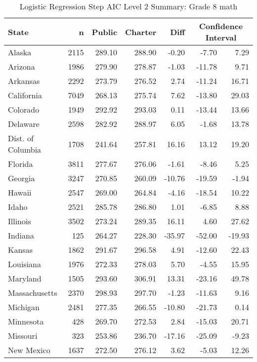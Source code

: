 \begin{table}[ht]
\begin{center}
\caption{Logistic Regression Step AIC Level 2 Summary: Grade 8 math}
\label{g8mathlraiclevel2}
\begin{tabular}{lrrrrrr}
  \hline
  State & n & Public & Charter & Diff & \multicolumn{2}{c}{Confidence Interval} \\ \hline
Alaska & 2115 & 289.10 & 288.90 & -0.20 & -7.70 & 7.29 \\ 
  Arizona & 1986 & 279.90 & 278.87 & -1.03 & -11.78 & 9.71 \\ 
  Arkansas & 2292 & 273.79 & 276.52 & 2.74 & -11.24 & 16.71 \\ 
  California & 7049 & 268.13 & 275.74 & 7.62 & -13.80 & 29.03 \\ 
  Colorado & 1949 & 292.92 & 293.03 & 0.11 & -13.44 & 13.66 \\ 
  Delaware & 2598 & 282.92 & 288.97 & 6.05 & -1.68 & 13.78 \\ 
  Dist. of Columbia & 1708 & 241.64 & 257.81 & 16.16 & 13.12 & 19.20 \\ 
  Florida & 3811 & 277.67 & 276.06 & -1.61 & -8.46 & 5.25 \\ 
  Georgia & 3247 & 270.85 & 260.09 & -10.76 & -19.59 & -1.94 \\ 
  Hawaii & 2547 & 269.00 & 264.84 & -4.16 & -18.54 & 10.22 \\ 
  Idaho & 2521 & 285.78 & 286.80 & 1.01 & -6.85 & 8.88 \\ 
  Illinois & 3502 & 273.24 & 289.35 & 16.11 & 4.60 & 27.62 \\ 
  Indiana & 125 & 264.27 & 228.30 & -35.97 & -52.00 & -19.93 \\ 
  Kansas & 1862 & 291.67 & 296.58 & 4.91 & -12.60 & 22.43 \\ 
  Louisiana & 1976 & 272.33 & 278.03 & 5.70 & -4.55 & 15.95 \\ 
  Maryland & 1505 & 293.60 & 306.91 & 13.31 & -23.16 & 49.78 \\ 
  Massachusetts & 2370 & 298.93 & 297.70 & -1.23 & -11.63 & 9.16 \\ 
  Michigan & 2481 & 277.35 & 266.55 & -10.80 & -21.73 & 0.14 \\ 
  Minnesota & 428 & 269.70 & 272.53 & 2.84 & -15.03 & 20.71 \\ 
  Missouri & 323 & 253.86 & 236.70 & -17.16 & -25.09 & -9.23 \\ 
  New Mexico & 1637 & 272.50 & 276.12 & 3.62 & -5.03 & 12.26 \\ 

\end{tabular}
\end{center}
\end{table}
